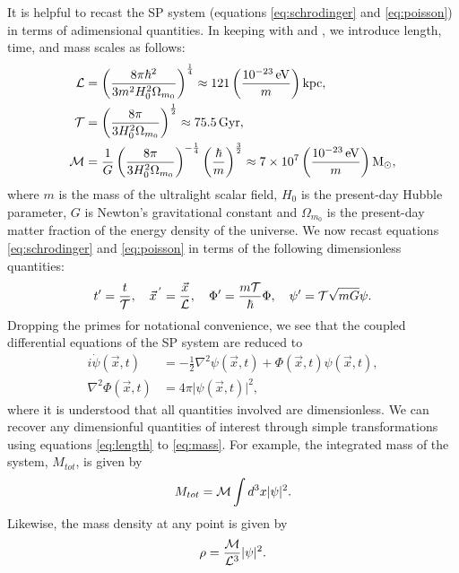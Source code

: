 \documentclass[a4paper,11pt]{article}
\begin{document}
It is helpful to recast the SP system (equations \ref{eq:schrodinger} and \ref{eq:poisson}) in terms of adimensional quantities. In keeping with \cite{Schive2014} and \cite{Paredes2016}, we introduce length, time, and mass scales as follows:
\begin{align}
    \CMcal{L}&=\left(\frac{8\pi\hbar^2}{3 m^2H_0^2\Omega_{m_0}}\right)^{\frac{1}{4}}\approx121\left(\frac{10^{-23}\operatorname{eV}}{m}\right)\operatorname{kpc},\label{eq:length}\\
    \CMcal{T}&=\left(\frac{8\pi}{3 H_0^2\Omega_{m_0}}\right)^{\frac{1}{2}}\approx75.5 \operatorname{Gyr},\label{eq:time}\\
    \CMcal{M}&=\frac{1}{G}\left(\frac{8\pi}{3 H_0^2\Omega_{m_0}}\right)^{-\frac{1}{4}}\left(\frac{\hbar}{m}\right)^{\frac{3}{2}}\approx 7\times 10^7\left(\frac{10^{-23}\operatorname{eV}}{m}\right)\operatorname{M}_{\odot},\label{eq:mass}
\end{align}
where $m$ is the mass of the ultralight scalar field, $H_0$ is the present-day Hubble parameter, $G$ is Newton's gravitational constant and $\Omega_{m_0}$ is the present-day matter fraction of the energy density of the universe. We now recast equations \ref{eq:schrodinger} and \ref{eq:poisson} in terms of the following dimensionless quantities:
\begin{equation}\label{eq:dimensionless}
    t'=\frac{t}{\CMcal{T}},\quad
    \vec{x}^{\,'}=\frac{\vec{x}}{\CMcal{L}},\quad
    \Phi'=\frac{m\CMcal{T}}{\hbar}\Phi,\quad
    \psi'=\CMcal{T}\sqrt{mG}\psi.
\end{equation}
Dropping the primes for notational convenience, we see that the coupled differential equations of the SP system are reduced to 
\begin{align}
    i\Dot{\psi}(\vec{x},t)&=-\frac{1}{2}\nabla^2\psi(\vec{x},t)+\Phi(\vec{x},t)\psi(\vec{x},t),\label{eq:s-adim}\\
    \nabla^2\Phi(\vec{x},t)&=4\pi\vert\psi(\vec{x},t)\vert^2,\label{eq:p-adim}
\end{align}
where it is understood that all quantities involved are dimensionless. We can recover any dimensionful quantities of interest through simple transformations using equations \ref{eq:length} to \ref{eq:mass}. For example, the integrated mass of the system, $M_{tot}$, is given by
\begin{equation}\label{eq:integrated-mass}
    M_{tot}=\CMcal{M}\int d^3x\vert\psi\vert^2.
\end{equation}
Likewise, the mass density at any point is given by
\begin{equation}\label{eq:density}
    \rho=\frac{\CMcal{M}}{\CMcal{L}^3}\vert\psi\vert^2.
\end{equation}
\end{document}
